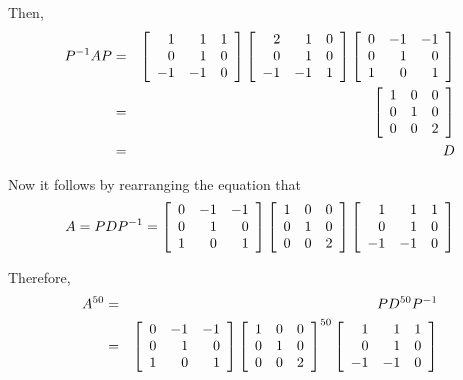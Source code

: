 \begin{solution}
Then, 
\begin{eqnarray*}
P^{-1}AP &=&\left[
\begin{array}{rrr}
1 & 1 & 1 \\
0 & 1 & 0 \\
-1 & -1 & 0
\end{array}
\right] \left[ 
\begin{array}{rrr}
2 & 1 & 0 \\
0 & 1 & 0 \\
-1 & -1 & 1
\end{array}
\right] \left[
\begin{array}{rrr}
0 & -1 & -1 \\
0 & 1 & 0 \\
1 & 0 & 1
\end{array}
\right] \\
&=&\left[
\begin{array}{rrr}
1 & 0 & 0 \\
0 & 1 & 0 \\
0 & 0 & 2
\end{array}
\right] \\
&=& D
\end{eqnarray*}

Now it follows by rearranging the equation that
\begin{equation*}
A=PDP^{-1}=\left[
\begin{array}{rrr}
0 & -1 & -1 \\
0 & 1 & 0 \\
1 & 0 & 1
\end{array}
\right] \left[
\begin{array}{rrr}
1 & 0 & 0 \\
0 & 1 & 0 \\
0 & 0 & 2
\end{array}
\right] \left[
\begin{array}{rrr}
1 & 1 & 1 \\
0 & 1 & 0 \\
-1 & -1 & 0
\end{array}
\right] 
\end{equation*}

Therefore,
\begin{eqnarray*}
A^{50} &=&PD^{50}P^{-1} \\
&=&\left[
\begin{array}{rrr}
0 & -1 & -1 \\
0 & 1 & 0 \\
1 & 0 & 1
\end{array}
\right] \left[
\begin{array}{rrr}
1 & 0 & 0 \\
0 & 1 & 0 \\
0 & 0 & 2
\end{array}
\right] ^{50}\left[
\begin{array}{rrr}
1 & 1 & 1 \\
0 & 1 & 0 \\
-1 & -1 & 0
\end{array}
\right] 
\end{eqnarray*}


\end{solution}
